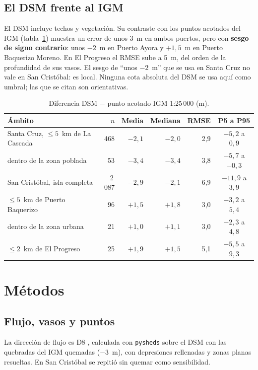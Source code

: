 \documentclass{sosg-informe}
\begin{document}
\subsection{El DSM frente al IGM}\label{sec:dsm}
El DSM incluye techos y vegetación. Su contraste con los puntos acotados del IGM (tabla~\ref{tab:dsm}) muestra un error de unos 3~m en ambos puertos, pero con \textbf{sesgo de signo contrario}: unos $-2$~m en Puerto Ayora y $+1{,}5$~m en Puerto Baquerizo Moreno. En El Progreso el RMSE sube a 5~m, del orden de la profundidad de sus vasos. El sesgo de \enquote{unos $-2$~m} que se usa en Santa Cruz no vale en San Cristóbal: es local. Ninguna cota absoluta del DSM se usa aquí como umbral; las que se citan son orientativas.

\begin{table}[ht]
  \centering\small
  \caption{Diferencia DSM $-$ punto acotado IGM 1:25\,000 (m).}
  \label{tab:dsm}
  \begin{tabular}{lrrrrc}
    \toprule
    Ámbito & $n$ & Media & Mediana & RMSE & P5 a P95 \\
    \midrule
    Santa Cruz, $\leq 5$~km de La Cascada & 468 & $-2{,}1$ & $-2{,}0$ & 2,9 & $-5{,}2$ a $0{,}9$ \\
    \quad dentro de la zona poblada & 53 & $-3{,}4$ & $-3{,}4$ & 3,8 & $-5{,}7$ a $-0{,}3$ \\
    San Cristóbal, isla completa & 2\,087 & $-2{,}9$ & $-2{,}1$ & 6,9 & $-11{,}9$ a $3{,}9$ \\
    \quad $\leq 5$~km de Puerto Baquerizo & 96 & $+1{,}5$ & $+1{,}8$ & 3,0 & $-3{,}2$ a $5{,}4$ \\
    \quad dentro de la zona urbana & 21 & $+1{,}0$ & $+1{,}1$ & 3,0 & $-2{,}3$ a $4{,}8$ \\
    \quad $\leq 2$~km de El Progreso & 25 & $+1{,}9$ & $+1{,}5$ & 5,1 & $-5{,}5$ a $9{,}3$ \\
    \bottomrule
  \end{tabular}
\end{table}

\section{Métodos}

\subsection{Flujo, vasos y puntos}
La dirección de flujo es D8 \citep{ocallaghan1984}, calculada con \texttt{pysheds} \citep{bartos2020} sobre el DSM con las quebradas del IGM quemadas ($-3$~m), con depresiones rellenadas y zonas planas resueltas. En San Cristóbal se repitió sin quemar como sensibilidad.
\end{document}
